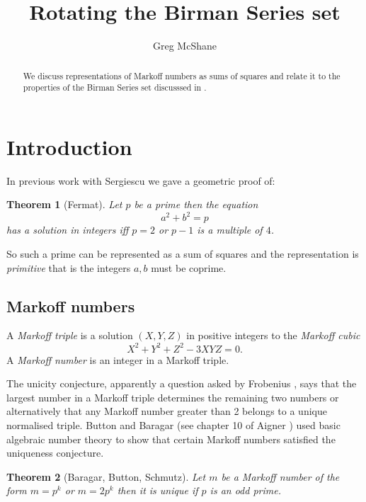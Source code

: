 \documentclass[14pt,a4paper]{amsart}
\title{Rotating the Birman Series set}
\author[McShane]{Greg McShane}
\newtheorem{thm}{Theorem}[section]
\begin{document}
\maketitle

\begin{abstract} 

We discuss representations of Markoff numbers as sums of squares and
relate it to the properties of the Birman Series set discusssed in
\cite{weierstrass}.

\end{abstract} 

\section{Introduction}


In previous work with Sergiescu \cite{vlad} we gave a geometric proof of:


\begin{thm}[Fermat]\label{fermat}
Let $p$ be a prime then the equation
$$a^2 + b^2 = p $$
has a solution in integers  iff  $p=2$ or $p-1$ is a multiple of $4$.
\end{thm}

So such a prime can be represented as a sum of squares and the
representation is \textit{primitive} that is the integers $a,b$ must
be coprime.

\subsection{Markoff numbers}


A \textit{Markoff triple} is a  solution $(X,Y,Z)$  in positive integers to
 the \textit{Markoff cubic}
 \begin{equation}\label{m cubic}
 X^2 + Y^2 + Z^2 - 3XYZ = 0.
 \end{equation}
 A \textit{Markoff number} is an integer in a Markoff triple.

The unicity conjecture, apparently a question asked by Frobenius \cite{frobenius}, says that the
largest number in a Markoff triple determines the remaining two numbers or
alternatively that any Markoff number greater than 2 belongs to a unique
normalised triple. 
Button and Baragar (see chapter 10 of Aigner \cite{aigner}) used  basic algebraic number theory to show that certain Markoff numbers satisfied the uniqueness conjecture.  



 \begin{thm}[Baragar, Button, Schmutz] \label{button}
 Let $m$ be a Markoff number of the form 
 $m=p^k$ or $m=2p^k$ then it is unique
if $p$ is an odd prime.
 \end{thm}
\end{document}

